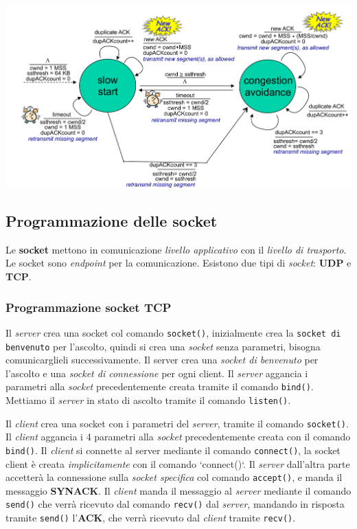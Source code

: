 \begin{center}
\includegraphics[width=\textwidth]{./img/diagrammacontrollodicongestione.png}
\end{center}

\subsection{Programmazione delle socket}

Le \textbf{socket} mettono in comunicazione \textit{livello applicativo} con il \textit{livello di trasporto}. Le socket sono \textit{endpoint} per la comunicazione. Esistono due tipi di \textit{socket}: \textbf{UDP} e \textbf{TCP}.

\subsubsection{Programmazione socket TCP}
Il \textit{server} crea una socket col comando \texttt{socket()}, inizialmente crea la \texttt{socket di benvenuto} per l'ascolto, quindi si crea una \textit{socket} senza parametri, bisogna comunicarglieli successivamente. Il server crea una \textit{socket di benvenuto} per l'ascolto e una \textit{socket di connessione} per ogni client.
Il \textit{server} aggancia i parametri alla \textit{socket} precedentemente creata tramite il comando \texttt{bind()}. Mettiamo il \textit{server} in stato di ascolto tramite il comando \texttt{listen()}.

Il \textit{client} crea una socket con i parametri del \textit{server}, tramite il comando \texttt{socket()}. Il \textit{client} aggancia i 4 parametri alla \textit{socket} precedentemente creata con il comando \texttt{bind()}. Il \textit{client} si connette al server mediante il comando \texttt{connect()}, la socket client è creata \textit{implicitamente} con il comando `connect()`. Il \textit{server} dall'altra parte accetterà la connessione sulla \textit{socket specifica} col comando \texttt{accept()}, e manda il messaggio \textbf{SYNACK}.
Il \textit{client} manda il messaggio al \textit{server} mediante il comando \texttt{send()} che verrà ricevuto dal comando \texttt{recv()} dal \textit{server}, mandando in risposta tramite \texttt{send()} l'\textbf{ACK}, che verrà ricevuto dal \textit{client} tramite \texttt{recv()}.

